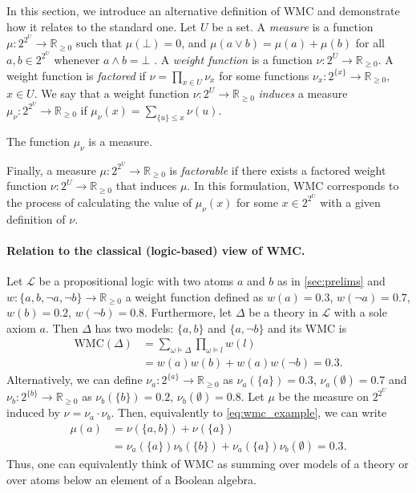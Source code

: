 In this section, we introduce an alternative definition of WMC and demonstrate
how it relates to the standard one. Let $U$ be a set. A \emph{measure} is a
function $\mu\colon 2^{2^U} \to \mathbb{R}_{\ge 0}$ such that $\mu(\bot) = 0$,
and $\mu(a \lor b) = \mu(a) + \mu(b)$ for all $a, b \in 2^{2^U}$ whenever $a
\land b = \bot$ \citep{gaifman1964concerning,DBLP:books/daglib/0090259}. A
\emph{weight function} is a function $\nu\colon 2^U \to \mathbb{R}_{\ge 0}$. A
weight function is \emph{factored} if $\nu = \prod_{x \in U} \nu_x$ for some
functions $\nu_x\colon 2^{\{x\}} \to \mathbb{R}_{\ge 0}$, $x \in U$. We say that
a weight function $\nu\colon 2^U \to \mathbb{R}_{\ge 0}$ \emph{induces} a
measure $\mu_\nu\colon 2^{2^U} \to \mathbb{R}_{\ge 0}$ if $\mu_\nu(x) =
\sum_{\{u\} \le x} \nu(u)$.

\begin{theorem} \label{prop:measure}
  The function $\mu_\nu$ is a measure.
\end{theorem}

Finally, a measure $\mu\colon 2^{2^U} \to \mathbb{R}_{\ge 0}$ is
\emph{factorable} if there exists a factored weight function $\nu\colon 2^U \to
\mathbb{R}_{\ge 0}$ that induces $\mu$. In this formulation, WMC corresponds to
the process of calculating the value of $\mu_\nu(x)$ for some $x \in 2^{2^U}$
with a given definition of $\nu$.

\paragraph{Relation to the classical (logic-based) view of WMC.} Let
$\mathcal{L}$ be a propositional logic with two atoms $a$ and $b$ as in
\cref{sec:prelims} and $w\colon \{ a, b, \neg a, \neg b \} \to \mathbb{R}_{\ge
  0}$ a weight function defined as $w(a) = 0.3$, $w(\neg a) = 0.7$, $w(b)
= 0.2$, $w(\neg b) = 0.8$. Furthermore, let $\Delta$ be a theory in
$\mathcal{L}$ with a sole axiom $a$. Then $\Delta$ has two models: $\{ a, b \}$
and $\{ a, \neg b \}$ and its WMC \citep{DBLP:journals/ai/ChaviraD08} is
\begin{equation} \label{eq:wmc_example}
  \begin{split}
    \mathrm{WMC}(\Delta) &= \sum_{\omega \models \Delta} \prod_{\omega \models l} w(l) \\
    &= w(a)w(b) + w(a)w(\neg b) = 0.3.
  \end{split}
\end{equation}
Alternatively, we can define $\nu_a\colon 2^{\{a\}} \to \mathbb{R}_{\ge 0}$ as
$\nu_a(\{ a \}) = 0.3$, $\nu_a(\emptyset) = 0.7$ and $\nu_b\colon 2^{\{b\}} \to
\mathbb{R}_{\ge 0}$ as $\nu_b(\{ b \}) = 0.2$, $\nu_b(\emptyset) = 0.8$. Let
$\mu$ be the measure on $2^{2^U}$ induced by $\nu = \nu_a \cdot \nu_b$. Then,
equivalently to \cref{eq:wmc_example}, we can write
\begin{align*}
  \mu(a) &= \nu(\{ a, b \}) + \nu(\{ a \}) \\
         &= \nu_a(\{a\})\nu_b(\{b\}) + \nu_a(\{a\})\nu_b(\emptyset) = 0.3.
\end{align*}
Thus, one can equivalently think of WMC as summing over models of a theory or
over atoms below an element of a Boolean algebra.

